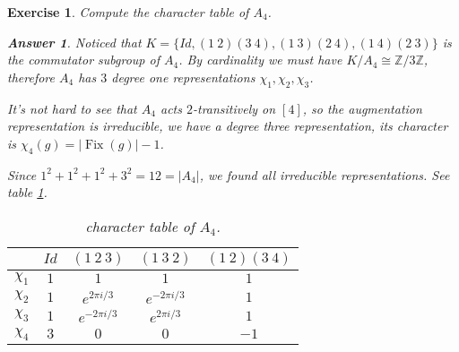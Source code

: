 \documentclass[11pt]{report}
\theoremstyle{mythm}
\newtheorem{exercise}{Exercise}[chapter]
\theoremstyle{myans}
\newtheorem*{answer}{Answer}
\newcommand{\bbZ}{\mathbb Z}
\newcommand{\Id}{\mathit{Id}}
\begin{document}
\begin{exercise}
  Compute the character table of $A_4$.
  \begin{answer}
    Noticed that $K=\{\Id, (1\ 2)(3\ 4),
    (1\ 3)(2\ 4), (1\ 4)(2\ 3)\}$ is the commutator subgroup of $A_4$. By cardinality we must have
    $K/A_4\cong \bbZ/3\bbZ$, therefore $A_4$ has $3$ degree one representations $\chi_1, \chi_2, \chi_3$.

    It's not hard to see that $A_4$ acts $2$-transitively on $[4]$, so the augmentation representation is irreducible,
    we have a degree three representation, its character is $\chi_4(g) = \left|\operatorname{Fix}(g)\right| - 1$.

    Since $1^2 + 1^2 + 1^2 + 3^2 = 12 = |A_4|$, we found all irreducible representations.
    See table \ref{tab:chartableA4}.

    \begin{table}[htbp]
      \centering
      \begin{tabular}[]{ccccc}
        \toprule
        & $\Id$ & $(1\ 2\ 3)$ & $(1\ 3\ 2)$ & $(1\ 2)(3\ 4)$ \\ \midrule
        $\chi_1$ & $1$ & $1$ & $1$ & $1$ \\
        $\chi_2$ & $1$ & $e^{2\pi i/3}$ & $e^{-2\pi i/3}$ & $1$ \\
        $\chi_3$ & $1$ & $e^{-2\pi i/3}$ & $e^{2\pi i/3}$ & $1$ \\
        $\chi_4$ & $3$ & $0$ & $0$ & $-1$ \\
        \bottomrule
      \end{tabular}
      \caption{character table of $A_4$.} \label{tab:chartableA4}
    \end{table}
  \end{answer}
\end{exercise}
\end{document}
